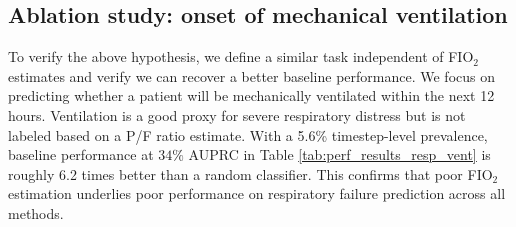 \documentclass[nohyperref]{article}
\begin{document}
\subsection{Ablation study: onset of mechanical ventilation}
 To verify the above hypothesis, we define a similar task independent of FIO$_2$ estimates and verify we can recover a better baseline performance. We focus on predicting whether a patient will be mechanically ventilated within the next 12 hours. Ventilation is a good proxy for severe respiratory distress but is not labeled based on a P/F ratio estimate. With a 5.6\% timestep-level prevalence, baseline performance at $34\%$ AUPRC in Table \ref{tab:perf_results_resp_vent} is roughly 6.2 times better than a random classifier. This confirms that poor FIO$_2$ estimation underlies poor performance on respiratory failure prediction across all methods. 


\begin{comment}
\begin{table}[tbh!]
    \centering
\caption{\textbf{Hyperparameter search range} for {respiratory failure} with Transformer \citep{DBLP:conf/nips/VaswaniSPUJGKP17} backbone. In \textbf{bold} are parameters selected by random search.}
\begin{tabular}{lc}
\toprule
Hyperparameter & Values\\
\midrule
\midrule
Learning Rate & (1e-5, 3e-5, \textbf{1e-4}, 3e-4) \\
\midrule
Drop-out & (0.0, 0.1, 0.2, \textbf{0.3}, 0.4) \\
\midrule
Attention Drop-out &   (\textbf{0.0}, 0.1, 0.2, 0.3, 0.4) \\
\midrule
Depth &   (1, \textbf{2}, 3) \\
\midrule
Heads &  (\textbf{1}, 2, 4) \\
\midrule
Hidden Dimension &  (32, \textbf{64}, 128, 256) \\
\midrule
L1 Regularization &  (1e-2, 1e-1, 1, \textbf{10}, 100)\\
\bottomrule
\end{tabular}
\label{tab:hp-search-resp}
\end{table}
\end{comment}
\end{document}

